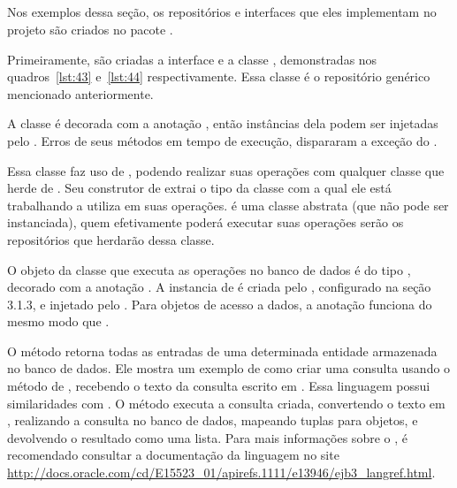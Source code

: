 \subsection{}

Nos exemplos dessa seção, os repositórios e interfaces que eles implementam no projeto  são criados no pacote .

Primeiramente, são criadas a interface  e a classe , demonstradas nos quadros~\ref{lst:43} e~\ref{lst:44} respectivamente. Essa classe é o repositório genérico mencionado anteriormente.



A classe  é decorada com a anotação , então instâncias dela podem ser injetadas pelo . Erros de seus métodos em tempo de execução, dispararam a exceção  do .

Essa classe faz uso de , podendo realizar suas operações com qualquer classe que herde de . Seu construtor de extrai o tipo da classe com a qual ele está trabalhando a utiliza em suas operações.  é uma classe abstrata (que não pode ser instanciada), quem efetivamente poderá executar suas operações serão os repositórios que herdarão dessa classe.

O objeto da classe que executa as operações no banco de dados é do tipo , decorado com a anotação . A instancia de  é criada pelo  , configurado na seção 3.1.3, e injetado pelo . Para objetos de acesso a dados, a anotação  funciona do mesmo modo que .

O método  retorna todas as entradas de uma determinada entidade armazenada no banco de dados. Ele mostra um exemplo de como criar uma consulta usando o método  de , recebendo o texto da consulta escrito em . Essa linguagem possui similaridades com . O método  executa a consulta criada, convertendo o texto  em , realizando a consulta no banco de dados, mapeando tuplas para objetos, e devolvendo o resultado como uma lista. Para mais informações sobre o , é recomendado consultar a documentação da linguagem no site \url{http://docs.oracle.com/cd/E15523_01/apirefs.1111/e13946/ejb3_langref.html}.

